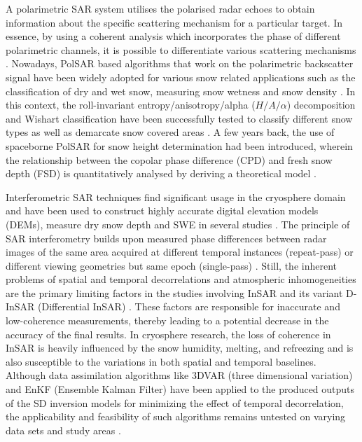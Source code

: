 \documentclass[review]{elsarticle}
\numberwithin{equation}{section}
\numberwithin{figure}{section}
\numberwithin{table}{section}
\begin{document}
A polarimetric SAR system utilises the polarised radar echoes to obtain information about the specific scattering mechanism for a particular target. In essence, by using a coherent analysis which incorporates the phase of different polarimetric channels, it is possible to differentiate various scattering mechanisms \citep{Lee2009}. Nowadays, PolSAR based algorithms that work on the polarimetric backscatter signal have been widely adopted for various snow related applications such as the classification of dry and wet snow, measuring snow wetness and snow density \citep{Singh2017, Snehmani2010, Thakur2012, Thakur2017, Usami2016}. In this context, the roll-invariant entropy/anisotropy/alpha ($H/A/{\alpha}$) decomposition and Wishart classification have been successfully tested to classify different snow types as well as demarcate snow covered areas \citep{Cloude2010,Lee2009,Singh2014}. A few years back, the use of spaceborne PolSAR for snow height determination had been introduced, wherein the relationship between the copolar phase difference (CPD) and fresh snow depth (FSD) is quantitatively analysed by deriving a theoretical model \citep{Leinss2014}.

Interferometric SAR techniques find significant usage in the cryosphere domain and have been used to construct highly accurate digital elevation models (DEMs), measure dry snow depth and SWE in several studies \citep{Guneriussen2001, Lei2016, Leinss2015, Li2017, Liu2017}. The principle of SAR interferometry builds upon measured phase differences between radar images of the same area acquired at different temporal instances (repeat-pass) or different viewing geometries but same epoch (single-pass) \citep{Hanssen2001}. Still, the inherent problems of spatial and temporal decorrelations and atmospheric inhomogeneities are the primary limiting factors in the studies involving InSAR and its variant D-InSAR (Differential InSAR) \citep{Pepe2017}. These factors are responsible for inaccurate and low-coherence measurements, thereby leading to a potential decrease in the accuracy of the final results. In cryosphere research, the loss of coherence in InSAR is heavily influenced by the snow humidity, melting, and refreezing and is also susceptible to the variations in both spatial and temporal baselines. Although data assimilation algorithms like 3DVAR (three dimensional variation) and EnKF (Ensemble Kalman Filter) have been applied to the produced outputs of the SD inversion models for minimizing the effect of temporal decorrelation, the applicability and feasibility of such algorithms remains untested on varying data sets and study areas \citep{Liu2017}.
\end{document}
